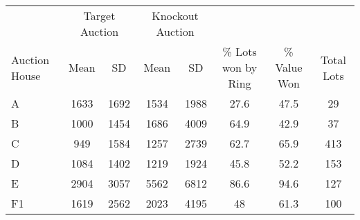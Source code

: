 \begin{tabular}{lccccccc}
\toprule
& \multicolumn{2}{c}{Target Auction} & \multicolumn{2}{c}{Knockout Auction} & & & \\
\cmidrule(lr){2-3}\cmidrule(lr){4-5}
Auction House & Mean & SD & Mean & SD & \% Lots won by Ring & \% Value Won & Total Lots \\ \midrule
A & 1633 & 1692 & 1534 & 1988 & 27.6 & 47.5 & 29 \\
B & 1000 & 1454 & 1686 & 4009 & 64.9 & 42.9 & 37 \\
C & 949 & 1584 & 1257 & 2739 & 62.7 & 65.9 & 413 \\
D & 1084 & 1402 & 1219 & 1924 & 45.8 & 52.2 & 153 \\
E & 2904 & 3057 & 5562 & 6812 & 86.6 & 94.6 & 127 \\
F1 & 1619 & 2562 & 2023 & 4195 & 48 & 61.3 & 100 \\
\bottomrule
\end{tabular}
